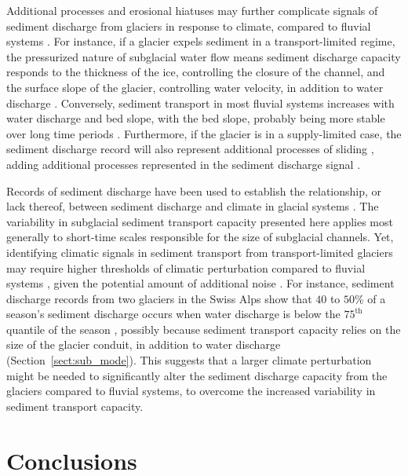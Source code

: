 \documentclass[11pt]{article}
\begin{document}
\begin{spacing}{1}
  Additional processes and erosional hiatuses may further complicate signals of sediment discharge from glaciers in response to climate, compared to fluvial systems \citep{jansson2005,ganti2016}. 
  For instance, if a glacier expels sediment in a transport-limited regime, the pressurized nature of subglacial water flow means sediment discharge capacity responds to the thickness of the ice, controlling the closure of the channel, and the surface slope of the glacier, controlling water velocity, in addition to water discharge \citep[Section~\ref{sect:sub_mode}; ] []{rothlisberger1972,shreve1972}.
  Conversely, sediment transport in most fluvial systems increases with water discharge and bed slope, with the bed slope, probably being more stable over long time periods \citep[Section~\ref{sect:fluv}; e.g.][]{muller1968,whipple1999,wong2006}. 
  Furthermore, if the glacier is in a supply-limited case, the sediment discharge record will also represent additional processes of sliding  \citep{herman2015,seguinot2021}, adding additional processes represented in the sediment discharge signal \citep{delaney2019}.
  
  Records of sediment discharge have been used to establish the relationship, or lack thereof, between sediment discharge and climate in glacial systems \citep[e.g.][]{koppes2009a,willenbring2016,mariotti2021}.
  The variability in subglacial sediment transport capacity presented here applies most generally to short-time scales responsible for the size of subglacial channels.
  Yet, identifying climatic signals in sediment transport from transport-limited glaciers may require higher thresholds of climatic perturbation compared to fluvial systems \citep{tofelde2021}, given the potential amount of additional noise \citep{castletort2003,jerolmack2010,romans2016}.
  For instance, sediment discharge records from two glaciers in the Swiss Alps show that $40$ to $50$\% of a season's sediment discharge occurs when water discharge is below the $75^{\mathrm{th}}$ quantile of the season \citep{delaney2018}, possibly because sediment transport capacity relies on the size of the glacier conduit, in addition to water discharge (Section~\ref{sect:sub_mode}).
  This suggests that a larger climate perturbation might be needed to significantly alter the sediment discharge capacity from the glaciers compared to fluvial systems, to overcome the increased variability in sediment transport capacity.


  \section{Conclusions}
  

\end{spacing}
\end{document}
